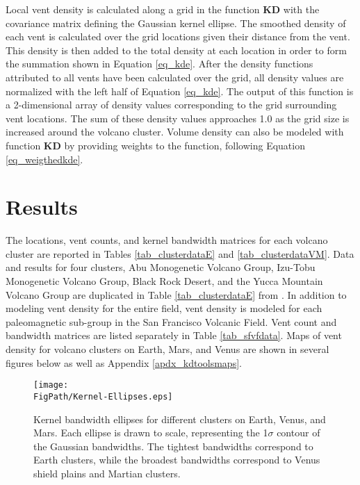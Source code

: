 Local vent density is calculated along a grid in the function \textbf{KD} with the covariance matrix defining the Gaussian kernel ellipse. The smoothed density of each vent is calculated over the grid locations given their distance from the vent. This density is then added to the total density at each location in order to form the summation shown in Equation \ref{eq_kde}. After the density functions attributed to all vents have been calculated over the grid, all density values are normalized with the left half of Equation \ref{eq_kde}. The output of this function is a 2-dimensional array of density values corresponding to the grid surrounding vent locations. The sum of these density values approaches 1.0 as the grid size is increased around the volcano cluster. Volume density can also be modeled with function \textbf{KD} by providing weights to the function, following Equation \ref{eq_weigthedkde}.

\section{Results}
The locations, vent counts, and kernel bandwidth matrices for each volcano cluster are reported in Tables \ref{tab_clusterdataE} and \ref{tab_clusterdataVM}. Data and results for four clusters, Abu Monogenetic Volcano Group, Izu-Tobu Monogenetic Volcano Group, Black Rock Desert, and the Yucca Mountain Volcano Group are duplicated in Table \ref{tab_clusterdataE} from \citet{kiyosugi2012relationship}. In addition to modeling vent density for the entire field, vent density is modeled for each paleomagnetic sub-group in the San Francisco Volcanic Field. Vent count and bandwidth matrices are listed separately in Table \ref{tab_sfvfdata}. Maps of vent density for volcano clusters on Earth, Mars, and Venus are shown in several figures below as well as Appendix \ref{apdx_kdtoolsmaps}.

\begin{figure}
\centering
\texttt{[image: \\FigPath/Kernel-Ellipses.eps]}
\caption[Kernel bandwidth ellipses for different clusters on Earth, Venus, and Mars]{Kernel bandwidth ellipses for different clusters on Earth, Venus, and Mars. Each ellipse is drawn to scale, representing the 1$\sigma$ contour of the Gaussian bandwidths. The tightest bandwidths correspond to Earth clusters, while the broadest bandwidths correspond to Venus shield plains and Martian clusters.}
\label{fig_bandwidths}
\end{figure}

